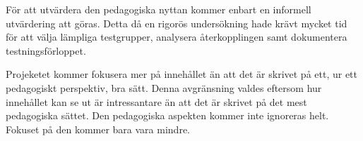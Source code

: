 \begin{draft}
För att utvärdera den pedagogiska nyttan kommer enbart en informell utvärdering
att göras. Detta då en rigorös undersökning hade krävt mycket tid för att välja
lämpliga testgrupper, analysera återkopplingen samt dokumentera
testningsförloppet.

Projeketet kommer fokusera mer på innehållet än att det är skrivet på ett, ur
ett pedagogiskt perspektiv, bra sätt. Denna avgränsning valdes eftersom hur
innehållet kan se ut är intressantare än att det är skrivet på det mest
pedagogiska sättet. Den pedagogiska aspekten kommer inte ignoreras helt. Fokuset
på den kommer bara vara mindre.

\end{draft}
